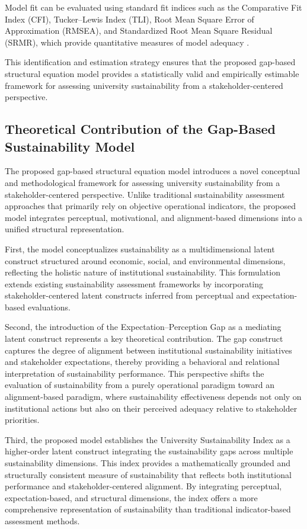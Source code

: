 \documentclass[11pt,a4paper]{article}
\begin{document}
Model fit can be evaluated using standard fit indices such as the Comparative Fit Index (CFI), Tucker–Lewis Index (TLI), Root Mean Square Error of Approximation (RMSEA), and Standardized Root Mean Square Residual (SRMR), which provide quantitative measures of model adequacy \cite{Kline2016,Byrne2016}.

This identification and estimation strategy ensures that the proposed gap-based structural equation model provides a statistically valid and empirically estimable framework for assessing university sustainability from a stakeholder-centered perspective.

\subsection{Theoretical Contribution of the Gap-Based Sustainability Model}

The proposed gap-based structural equation model introduces a novel conceptual and methodological framework for assessing university sustainability from a stakeholder-centered perspective. Unlike traditional sustainability assessment approaches that primarily rely on objective operational indicators, the proposed model integrates perceptual, motivational, and alignment-based dimensions into a unified structural representation.

First, the model conceptualizes sustainability as a multidimensional latent construct structured around economic, social, and environmental dimensions, reflecting the holistic nature of institutional sustainability. This formulation extends existing sustainability assessment frameworks by incorporating stakeholder-centered latent constructs inferred from perceptual and expectation-based evaluations.

Second, the introduction of the Expectation--Perception Gap as a mediating latent construct represents a key theoretical contribution. The gap construct captures the degree of alignment between institutional sustainability initiatives and stakeholder expectations, thereby providing a behavioral and relational interpretation of sustainability performance. This perspective shifts the evaluation of sustainability from a purely operational paradigm toward an alignment-based paradigm, where sustainability effectiveness depends not only on institutional actions but also on their perceived adequacy relative to stakeholder priorities.

Third, the proposed model establishes the University Sustainability Index as a higher-order latent construct integrating the sustainability gaps across multiple sustainability dimensions. This index provides a mathematically grounded and structurally consistent measure of sustainability that reflects both institutional performance and stakeholder-centered alignment. By integrating perceptual, expectation-based, and structural dimensions, the index offers a more comprehensive representation of sustainability than traditional indicator-based assessment methods.
\end{document}
